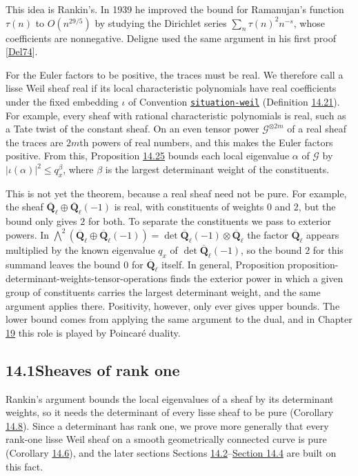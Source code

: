 \documentclass[11pt]{article}
\newcommand{\bpslug}[1]{\texttt{#1}}
\begin{document}
This idea is Rankin's. In 1939 he improved the bound for Ramanujan's function \(\tau(n)\) to \(O(n^{29/5})\) by studying the Dirichlet series \(\sum_n\tau(n)^2n^{-s}\), whose coefficients are nonnegative. Deligne used the same argument in his first proof [\hyperref[bp350]{Del74}].

For the Euler factors to be positive, the traces must be real. We therefore call a lisse Weil sheaf real if its local characteristic polynomials have real coefficients under the fixed embedding \(\iota\) of Convention \hyperref[bp7]{\bpslug{situation-{}\allowbreak{}weil}} (Definition \hyperref[bp107]{14.21}). For example, every sheaf with rational characteristic polynomials is real, such as a Tate twist of the constant sheaf. On an even tensor power \(\mathcal G^{\otimes2m}\) of a real sheaf the traces are \(2m\)th powers of real numbers, and this makes the Euler factors positive. From this, Proposition \hyperref[bp116]{14.25} bounds each local eigenvalue \(\alpha\) of \(\mathcal G\) by \(|\iota(\alpha)|^2\le q_x^\beta\), where \(\beta\) is the largest determinant weight of the constituents.

This is not yet the theorem, because a real sheaf need not be pure. For example, the sheaf \(\overline{\mathbf Q}_\ell\oplus\overline{\mathbf Q}_\ell(-1)\) is real, with constituents of weights \(0\) and \(2\), but the bound only gives \(2\) for both. To separate the constituents we pass to exterior powers. In \(\bigwedge^2(\overline{\mathbf Q}_\ell\oplus\overline{\mathbf Q}_\ell(-1))=\det\overline{\mathbf Q}_\ell(-1)\otimes\overline{\mathbf Q}_\ell\) the factor \(\overline{\mathbf Q}_\ell\) appears multiplied by the known eigenvalue \(q_x\) of \(\det\overline{\mathbf Q}_\ell(-1)\), so the bound \(2\) for this summand leaves the bound \(0\) for \(\overline{\mathbf Q}_\ell\) itself. In general, Proposition proposition-determinant-weights-tensor-operations finds the exterior power in which a given group of constituents carries the largest determinant weight, and the same argument applies there. Positivity, however, only ever gives upper bounds. The lower bound comes from applying the same argument to the dual, and in Chapter \hyperref[bp319]{19} this role is played by Poincaré duality.

\subsection*{\texorpdfstring{14.1\quad Sheaves of rank one}{14.1 Sheaves of rank one}}
\label{bp41}%
\label{bp42}%
Rankin's argument bounds the local eigenvalues of a sheaf by its determinant weights, so it needs the determinant of every lisse sheaf to be pure (Corollary \hyperref[bp65]{14.8}). Since a determinant has rank one, we prove more generally that every rank-one lisse Weil sheaf on a smooth geometrically connected curve is pure (Corollary \hyperref[bp61]{14.6}), and the later sections Sections \hyperref[bp69]{14.2}–\hyperref[bp118]{Section 14.4} are built on this fact.
\end{document}
